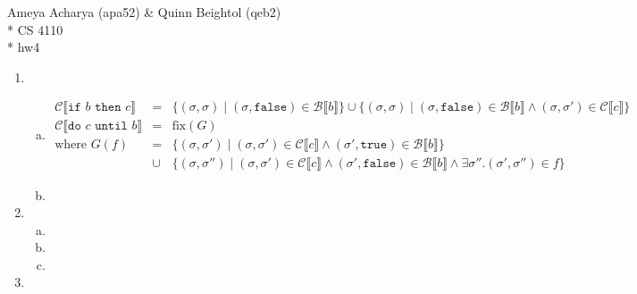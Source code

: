 \documentclass[10pt, oneside]{article}
\begin{document}
\noindent Ameya Acharya (apa52) \& Quinn Beightol (qeb2) \\*
\noindent CS 4110 \\*
\noindent hw4

\begin{enumerate}[1.]
  \item
  \begin{enumerate}[(a)] 
    \item 
    \begin{eqnarray*}
      \mathcal{C}\llbracket \texttt{if } b \texttt{ then } c \rrbracket & = & 
        \{ (\sigma, \sigma) \mid (\sigma, \texttt{false}) \in \mathcal{B}
                                                          \llbracket b \rrbracket \}
        \cup \{ (\sigma, \sigma) \mid (\sigma, \texttt{false}) \in \mathcal{B}
          \llbracket b \rrbracket \wedge (\sigma, \sigma') \in \mathcal{C}
                                                        \llbracket c \rrbracket \}\\
      \mathcal{C} \llbracket \texttt{do } c \texttt{ until } b  \rrbracket 
        & = & \text{fix}(G)\\
      \text{where } G(f) & = &
  				\{ (\sigma, \sigma') \mid (\sigma, \sigma') \in \mathcal{C} 
				                                              \llbracket c \rrbracket
		 \wedge (\sigma', \texttt{true}) \in \mathcal{B} \llbracket b \rrbracket \} \\
				& \cup & \{ (\sigma, \sigma'') \mid 
				            (\sigma, \sigma')  \in \mathcal{C} \llbracket c \rrbracket 
				     \wedge (\sigma', \texttt{false})\in \mathcal{B} \llbracket b \rrbracket
				     \wedge \exists \sigma''. (\sigma', \sigma'') \in f \}
    \end{eqnarray*}
    \item 
  \end{enumerate}

  \item
  \begin{enumerate} [(a)]
    \item
    \item
    \item
  \end{enumerate}

  \item


\end{enumerate}
\end{document}
